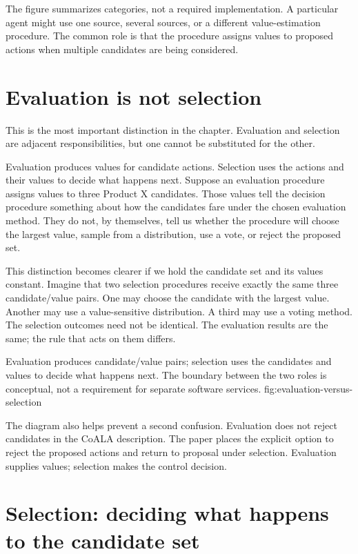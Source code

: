 The figure summarizes categories, not a required implementation. A particular agent might use one source, several sources, or a different value-estimation procedure. The common role is that the procedure assigns values to proposed actions when multiple candidates are being considered.

\section{Evaluation is not selection}
\label{sec:evaluation-not-selection}

This is the most important distinction in the chapter. Evaluation and selection are adjacent responsibilities, but one cannot be substituted for the other.

Evaluation produces values for candidate actions. Selection uses the actions and their values to decide what happens next. Suppose an evaluation procedure assigns values to three Product X candidates. Those values tell the decision procedure something about how the candidates fare under the chosen evaluation method. They do not, by themselves, tell us whether the procedure will choose the largest value, sample from a distribution, use a vote, or reject the proposed set.

This distinction becomes clearer if we hold the candidate set and its values constant. Imagine that two selection procedures receive exactly the same three candidate/value pairs. One may choose the candidate with the largest value. Another may use a value-sensitive distribution. A third may use a voting method. The selection outcomes need not be identical. The evaluation results are the same; the rule that acts on them differs.

  {Evaluation produces candidate/value pairs; selection uses the candidates and values to decide what happens next. The boundary between the two roles is conceptual, not a requirement for separate software services.}
  {fig:evaluation-versus-selection}

The diagram also helps prevent a second confusion. Evaluation does not reject candidates in the CoALA description. The paper places the explicit option to reject the proposed actions and return to proposal under selection. Evaluation supplies values; selection makes the control decision.

\section{Selection: deciding what happens to the candidate set}
\label{sec:selection}

